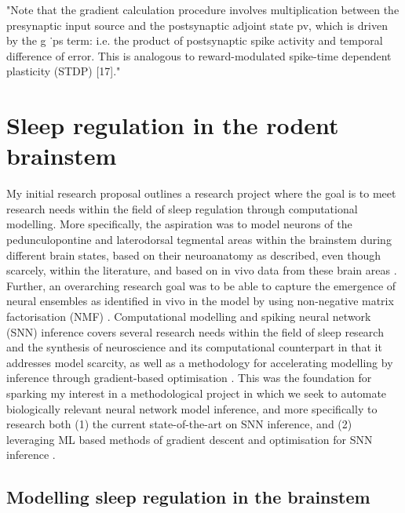 \documentclass[mphil,deptreport,ai]{infthesis} %
\begin{document}
"Note that the gradient calculation procedure involves multiplication between the presynaptic input source and the postsynaptic adjoint state pv, which is driven by the g ˙ps term: i.e. the product of postsynaptic spike activity and temporal difference of error. This is analogous to reward-modulated spike-time dependent plasticity (STDP) [17]."


\chapter{Sleep regulation in the rodent brainstem}

My initial research proposal outlines a research project where the goal is to meet research needs within the field of sleep regulation through computational modelling.
More specifically, the aspiration was to model neurons of the pedunculopontine and laterodorsal tegmental areas within the brainstem during different brain states, based on their neuroanatomy as described, even though scarcely, within the literature, and based on in vivo data from these brain areas \cite{Herice2019c, Tsunematsu2019, Pal2007, Martinez-Gonzalez2011, Fraigne2015}.
Further, an overarching research goal was to be able to capture the emergence of neural ensembles as identified in vivo in the model by using non-negative matrix factorisation (NMF) \cite{Seung1999, Seung2001, Onken2016a}.
Computational modelling and spiking neural network (SNN) inference covers several research needs within the field of sleep research and the synthesis of neuroscience and its computational counterpart in that it addresses model scarcity, as well as a methodology for accelerating modelling by inference through gradient-based optimisation \cite{Herice2019c, Huh2017, Taherkhani2020}.
This was the foundation for sparking my interest in a methodological project in which we seek to automate biologically relevant neural network model inference, and more specifically to research both (1) the current state-of-the-art on SNN inference, and (2) leveraging ML based methods of gradient descent and optimisation for SNN inference \cite{Huh2017, Mostafa2020, Tavanaei2019b, Lee2016}.


\section{Modelling sleep regulation in the brainstem}
\end{document}
